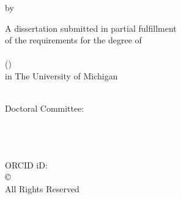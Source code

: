 \thispagestyle{empty}


\begin{center}
        \Huge
        \thesistitle

        \vspace{12pt}

        \Large
        by

        \vspace{12pt}

        \thesisauthor

        \vspace{0.5in}

        \large
        A dissertation submitted in partial fulfillment \\
        of the requirements for the degree of \\
        \thesisdegree \\
        (\thesisdepartment) \\
        in The University of Michigan \\
        \thesisyear \\

\end{center}

\vfill
\large
\noindent Doctoral Committee:
\\
\\
\thesiscommittee

\normalsize
\restoregeometry
\newpage
\thispagestyle{empty}






\hspace{0pt}
\vfill
\begin{center}
        \thesisauthor \\
        \thesisemail \\
        ORCID iD: \thesisorcid \\
        \vspace{1in}
        \copyright\hspace{0.2in}{\thesisauthor}\hspace{0.2in}\thesisyear\\ %
        \vspace{0.1in}All Rights Reserved
\end{center}
\vfill
\hspace{0pt}

